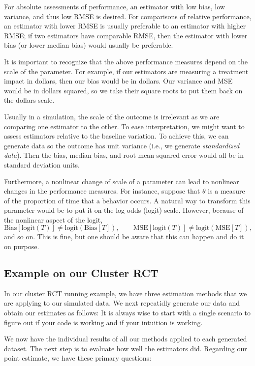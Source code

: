 \documentclass[
]{book}
\begin{document}
For absolute assessments of performance, an estimator with low bias, low variance, and thus low RMSE is desired.
For comparisons of relative performance, an estimator with lower RMSE is usually preferable to an estimator with higher RMSE; if two estimators have comparable RMSE, then the estimator with lower bias (or lower median bias) would usually be preferable.

It is important to recognize that the above performance measures depend on the scale of the parameter.
For example, if our estimators are measuring a treatment impact in dollars, then our bias would be in dollars.
Our variance and MSE would be in dollars squared, so we take their square roots to put them back on the dollars scale.

Usually in a simulation, the scale of the outcome is irrelevant as we are comparing one estimator to the other.
To ease interpretation, we might want to assess estimators relative to the baseline variation.
To achieve this, we can generate data so the outcome has unit variance (i.e., we generate \emph{standardized data}).
Then the bias, median bias, and root mean-squared error would all be in standard deviation units.

Furthermore, a nonlinear change of scale of a parameter can lead to nonlinear changes in the performance measures.
For instance, suppose that \(\theta\) is a measure of the proportion of time that a behavior occurs.
A natural way to transform this parameter would be to put it on the log-odds (logit) scale.
However, because of the nonlinear aspect of the logit,
\[\text{Bias}\left[\text{logit}(T)\right] \neq \text{logit}\left(\text{Bias}[T]\right), \qquad \text{MSE}\left[\text{logit}(T)\right] \neq \text{logit}\left(\text{MSE}[T]\right),\]
and so on.
This is fine, but one should be aware that this can happen and do it on purpose.

\hypertarget{example-on-our-cluster-rct}{%
\subsection{Example on our Cluster RCT}\label{example-on-our-cluster-rct}}

In our cluster RCT running example, we have three estimation methods that we are applying to our simulated data.
We next repeatidly generate our data and obtain our estimates as follows:
It is always wise to start with a single scenario to figure out if your code is working and if your intuition is working.

We now have the individual results of all our methods applied to each generated dataset.
The next step is to evaluate how well the estimators did.
Regarding our point estimate, we have these primary questions:
\end{document}
